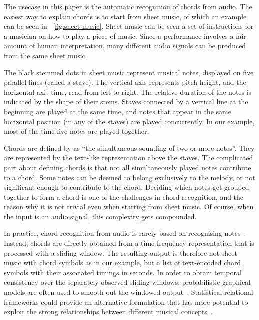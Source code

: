 \documentclass[letterpaper]{article} %
\newcommand{\figref}[1]{\figurename~\ref{fig:#1}} %
\begin{document}
The usecase in this paper is the automatic recognition of chords from audio. The easiest way to explain chords is to start from sheet music, of which an example can be seen in \figref{sheet-music}. Sheet music can be seen a set of instructions for a musician on how to play a piece of music. 
Since a performance involves a fair amount of human interpretation, many different audio signals can be produced from the same sheet music.

The black stemmed dots in sheet music represent musical notes, displayed on five parallel lines (called a stave). The vertical axis represents pitch height, and the horizontal axis time, read from left to right. The relative duration of the notes is indicated by the shape of their stems. Staves connected by a vertical line at the beginning are played at the same time, and notes that appear in the same horizontal position (in any of the staves) are played concurrently. In our example, most of the time five notes are played together.

Chords are defined by \citeauthor{grovemusic} as ``the simultaneous sounding of two or more notes''. They are represented by the text-like representation above the staves. The complicated part about defining chords is that not all simultaneously played notes contribute to a chord. Some notes can be deemed to belong exclusively to the melody, or not significant enough to contribute to the chord. Deciding which notes get grouped together to form a chord is one of the challenges in chord recognition, and the reason why it is not trivial even when starting from sheet music. Of course, when the input is an audio signal, this complexity gets compounded.

In practice, chord recognition from audio is rarely based on recognising notes~\cite{pauwels2019ismir}. Instead, chords are directly obtained from a time-frequency representation that is processed with a sliding window. The resulting output is therefore not sheet music with chord symbols as in our example, but a list of text-encoded chord symbols with their associated timings in seconds. In order to obtain temporal consistency over the separately observed sliding windows, probabilistic graphical models are often used to smooth out the windowed output~\cite{pauwels2019ismir}. Statistical relational frameworks could provide an alternative formulation that has more potential to exploit the strong relationships between different musical concepts~\cite{papadopoulos2017taslp}.
\end{document}
